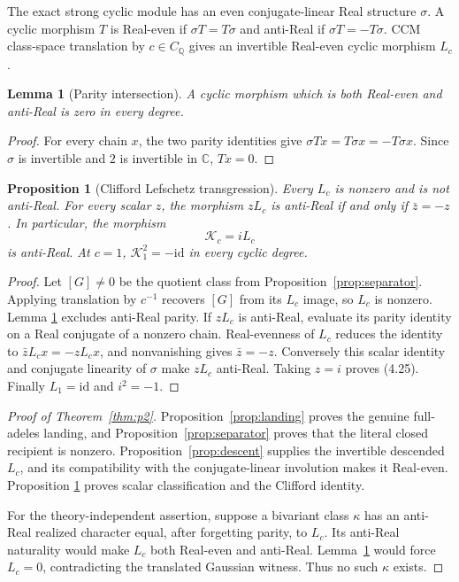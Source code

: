 \documentclass[11pt,reqno]{amsart}
\newtheorem{proposition}[theorem]{Proposition}
\newtheorem{lemma}[theorem]{Lemma}
\newcommand{\C}{\mathbb C}
\newcommand{\Q}{\mathbb Q}
\newcommand{\id}{\mathrm{id}}
\begin{document}
The exact strong cyclic module has an even conjugate-linear Real structure $\sigma$.  A cyclic
morphism $T$ is Real-even if $\sigma T=T\sigma$ and anti-Real if
$\sigma T=-T\sigma$.  CCM class-space translation by $c\in C_\Q$ gives an invertible Real-even
cyclic morphism $L_c$.

\begin{lemma}[Parity intersection]\label{lem:parityintersection}
A cyclic morphism which is both Real-even and anti-Real is zero in every degree.
\end{lemma}

\begin{proof}
For every chain $x$, the two parity identities give
$\sigma T x=T\sigma x=-T\sigma x$.  Since $\sigma$ is invertible and $2$ is invertible in $\C$,
$Tx=0$.
\end{proof}

\begin{proposition}[Clifford Lefschetz transgression]\label{prop:clifford}
Every $L_c$ is nonzero and is not anti-Real.  For every scalar $z$, the morphism $zL_c$ is
anti-Real if and only if $\bar z=-z$.  In particular, the morphism
\[
                         \mathcal K_c=iL_c            \tag{4.25}
\]
is anti-Real.  At $c=1$, $\mathcal K_1^2=-\id$ in every cyclic degree.
\end{proposition}

\begin{proof}
Let $[G]\ne0$ be the quotient class from Proposition~\ref{prop:separator}.  Applying translation
by $c^{-1}$ recovers $[G]$ from its $L_c$ image, so $L_c$ is nonzero.  Lemma
\ref{lem:parityintersection} excludes anti-Real parity.  If $zL_c$ is anti-Real, evaluate its
parity identity on a Real conjugate of a nonzero chain.  Real-evenness of $L_c$ reduces the identity
to $\bar zL_cx=-zL_cx$, and nonvanishing gives $\bar z=-z$.  Conversely this scalar identity and
conjugate linearity of $\sigma$ make $zL_c$ anti-Real.  Taking $z=i$ proves (4.25).  Finally
$L_1=\id$ and $i^2=-1$.
\end{proof}

\begin{proof}[Proof of Theorem~\ref{thm:p2}]
Proposition~\ref{prop:landing} proves the genuine full-adeles landing, and
Proposition~\ref{prop:separator} proves that the literal closed recipient is nonzero.
Proposition~\ref{prop:descent} supplies the invertible descended $L_c$, and its compatibility with
the conjugate-linear involution makes it Real-even.  Proposition
\ref{prop:clifford} proves scalar classification and the Clifford identity.

For the theory-independent assertion, suppose a bivariant class $\kappa$ has an anti-Real
realized character equal, after forgetting parity, to $L_c$.  Its anti-Real naturality would make
$L_c$ both Real-even and anti-Real.  Lemma~\ref{lem:parityintersection} would force $L_c=0$,
contradicting the translated Gaussian witness.  Thus no such $\kappa$ exists.
\end{proof}
\end{document}
